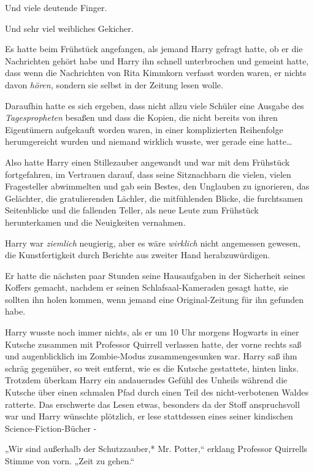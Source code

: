 {Und viele deutende Finger.

Und sehr viel weibliches Gekicher.

Es hatte beim Frühstück angefangen, als jemand Harry gefragt hatte, ob er die Nachrichten gehört habe und Harry ihn schnell unterbrochen und gemeint hatte, dass wenn die Nachrichten von Rita Kimmkorn verfasst worden waren, er nichts davon \emph{hören,} sondern sie selbst in der Zeitung lesen wolle.

Daraufhin hatte es sich ergeben, dass nicht allzu viele Schüler eine Ausgabe des \emph{Tagespropheten} besaßen und dass die Kopien, die nicht bereits von ihren Eigentümern aufgekauft worden waren, in einer komplizierten Reihenfolge herumgereicht wurden und niemand wirklich wusste, wer gerade eine hatte…

Also hatte Harry einen Stillezauber angewandt und war mit dem Frühstück fortgefahren, im Vertrauen darauf, dass seine Sitznachbarn die vielen, vielen Fragesteller abwimmelten und gab sein Bestes, den Unglauben zu ignorieren, das Gelächter, die gratulierenden Lächler, die mitfühlenden Blicke, die furchtsamen Seitenblicke und die fallenden Teller, als neue Leute zum Frühstück herunterkamen und die Neuigkeiten vernahmen.

Harry war \emph{ziemlich} neugierig, aber es wäre \emph{wirklich} nicht angemessen gewesen, die Kunstfertigkeit durch Berichte aus zweiter Hand herabzuwürdigen.

Er hatte die nächsten paar Stunden seine Hausaufgaben in der Sicherheit seines Koffers gemacht, nachdem er seinen Schlafsaal-Kameraden gesagt hatte, sie sollten ihn holen kommen, wenn jemand eine Original-Zeitung für ihn gefunden habe.

Harry wusste noch immer nichts, als er um 10 Uhr morgens Hogwarts in einer Kutsche zusammen mit Professor Quirrell verlassen hatte, der vorne rechts saß und augenblicklich im Zombie-Modus zusammengesunken war. Harry saß ihm schräg gegenüber, so weit entfernt, wie es die Kutsche gestattete, hinten links. Trotzdem überkam Harry ein andauerndes Gefühl des Unheils während die Kutsche über einen schmalen Pfad durch einen Teil des nicht-verbotenen Waldes ratterte. Das erschwerte das Lesen etwas, besonders da der Stoff anspruchsvoll war und Harry wünschte plötzlich, er lese stattdessen eines seiner kindischen Science-Fiction-Bücher -

„Wir sind außerhalb der Schutzzauber,* Mr. Potter,“ erklang Professor Quirrells Stimme von vorn. „Zeit zu gehen.“

}
